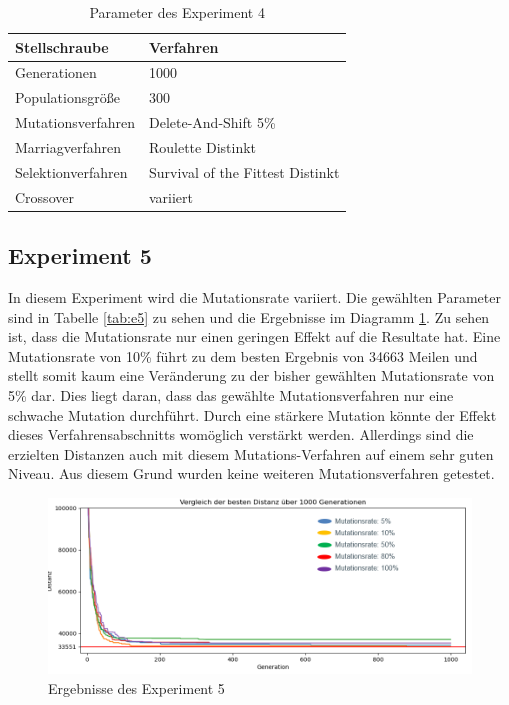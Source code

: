 \begin{table}[H]
\centering
\caption{Parameter des Experiment 4}
\begin{tabular}{ll}
Stellschraube & Verfahren \\
\hline
Generationen & 1000 \\
Populationsgröße & 300 \\
Mutationsverfahren & Delete-And-Shift 5\% \\
Marriagverfahren & Roulette Distinkt \\
Selektionverfahren & Survival of the Fittest Distinkt \\
Crossover & variiert
\end{tabular}
\label{tab:e4}
\end{table}

\subsection{Experiment 5}
In diesem Experiment wird die Mutationsrate variiert. Die gewählten Parameter sind in Tabelle \ref{tab:e5} zu sehen und die Ergebnisse im Diagramm \ref{fig:experiment5}. Zu sehen ist, dass die Mutationsrate nur einen geringen Effekt auf die Resultate hat. 
Eine Mutationsrate von 10\% führt zu dem besten Ergebnis von 34663 Meilen und stellt somit kaum eine Veränderung zu der bisher gewählten Mutationsrate von 5\% dar. Dies liegt daran, dass das gewählte Mutationsverfahren nur eine schwache Mutation durchführt. Durch eine stärkere Mutation könnte der Effekt dieses Verfahrensabschnitts womöglich verstärkt werden. Allerdings sind die erzielten Distanzen auch mit diesem Mutations-Verfahren auf einem sehr guten Niveau. Aus diesem Grund wurden keine weiteren Mutationsverfahren getestet.

\begin{figure}[H]
\centering
\includegraphics[width=1\textwidth]{img/Vortrag/experiment5.png}
\caption{Ergebnisse des Experiment 5}
\label{fig:experiment5}
\end{figure}

